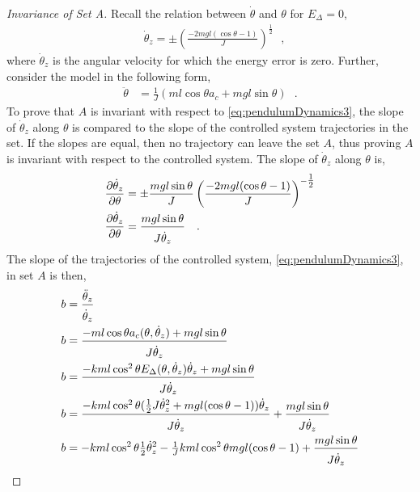 \begin{proof}[Invariance of Set A]
  \label{pr:invariantA}
  Recall the relation between $\dot{\theta}$ and $\theta$ for $E_\Delta = 0$,
  \begin{align}
    &\dot{\theta}_z = \pm \left(\frac{-2 m g l (\cos \theta -1)}{J}\right)^{\tfrac{1}{2}}  \ \ \ ,  \label{eq:thetaDotForEDeltaZero}
  \end{align}
  where $\dot{\theta}_z$ is the angular velocity for which the energy error is zero. Further, consider the model in the following form,
  \begin{align}
    \ddot{\theta} &= \tfrac{1}{J} ( m l \cos \theta a_c + m g l \sin \theta ) \ \ \ .  \label{eq:pendulumDynamics3}
  \end{align}
  To prove that $A$ is invariant with respect to \autoref{eq:pendulumDynamics3}, the slope of $\dot{\theta}_z$ along $\theta$ is compared to the slope of the controlled system trajectories in the set. If the slopes are equal, then no trajectory can leave the set $A$, thus proving $A$ is invariant with respect to the controlled system. The slope of $\dot{\theta}_z$ along $\theta$ is,
  \begin{align}
    \frac{\partial \dot{\theta}_z}{\partial \theta} &= \pm \frac{m g l \sin\theta}{ J } \left(\frac{-2 m g l (\cos \theta -1)}{J}\right)^{-\tfrac{1}{2}} \\
    \frac{\partial \dot{\theta}_z}{\partial \theta} &= \frac{m g l \sin\theta}{ J \rule{0pt}{12pt}\dot{\theta}_z}  \ \ \ .  \label{eq:thetaDotForEDeltaZero_dTheta}
  \end{align}
  The slope of the trajectories of the controlled system, \autoref{eq:pendulumDynamics3}, in set $A$ is then,
  \begin{align}
    b &= \frac{\ddot{\theta}_z}{\rule{0pt}{12pt}\dot{\theta}_z} \\
    b &= \frac{- m l \cos \theta a_c( \theta, \dot{\theta}_z ) + m g l \sin \theta}{ J \rule{0pt}{12pt}\dot{\theta}_z} \\
    b &= \frac{- k m l \cos^2 \theta E_\Delta( \theta, \dot{\theta}_z ) \dot{\theta}_z + m g l \sin \theta}{ J \rule{0pt}{12pt}\dot{\theta}_z} \\
    b &= \frac{- k m l \cos^2 \theta ( \tfrac{1}{2} J \dot{\theta}_z^2 + m g l (\cos \theta -1)  ) \dot{\theta}_z}{ J \rule{0pt}{12pt}\dot{\theta}_z}  +  \frac{m g l \sin \theta}{ J \rule{0pt}{12pt}\dot{\theta}_z} \\
    b &= - k m l \cos^2 \theta \tfrac{1}{2} \dot{\theta}_z^2 - \tfrac{1}{J} k m l \cos^2 \theta m g l (\cos \theta -1)  +  \frac{m g l \sin \theta}{ J \rule{0pt}{12pt}\dot{\theta}_z} \\

\end{align}
\end{proof}
